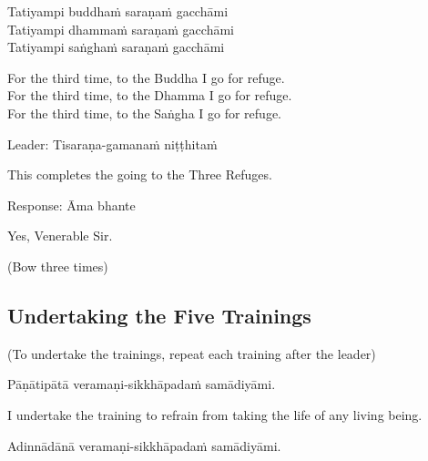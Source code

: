 Tatiyampi buddhaṁ saraṇaṁ gacchāmi\\
Tatiyampi dhammaṁ saraṇaṁ gacchāmi\\
Tatiyampi saṅghaṁ saraṇaṁ gacchāmi\\

\begin{english}
  For the third time, to the Buddha I go for refuge.\\
  For the third time, to the Dhamma I go for refuge.\\
  For the third time, to the Saṅgha I go for refuge.\\
\end{english}

Leader: Tisaraṇa-gamanaṁ niṭṭhitaṁ\\

\begin{english}
  This completes the going to the Three Refuges.\\
\end{english}

Response: Āma bhante\\

\begin{english}
  Yes, Venerable Sir.\\
\end{english}

\begin{center}
  (Bow three times)\\
\end{center}

\subsection{Undertaking the Five Trainings}

\begin{center}
  (To undertake the trainings, repeat each training after the leader)\\
\end{center}

Pāṇātipātā veramaṇi-sikkhāpadaṁ samādiyāmi.\\

\begin{english}
  I undertake the training
  to refrain from taking the life of any living being.\\
\end{english}

Adinnādānā veramaṇi-sikkhāpadaṁ samādiyāmi.\\

